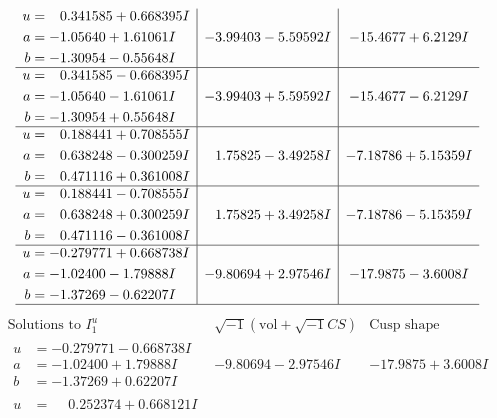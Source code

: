 \documentclass[1p]{elsarticle_modified}
\theoremstyle{definition}
\newcommand{\I}{\sqrt{-1}}
\begin{document}
$$\begin{array}{c|c|c}
\begin{aligned}
u &= \phantom{-}0.341585 + 0.668395 I \\
a &= -1.05640 + 1.61061 I \\
b &= -1.30954 - 0.55648 I\end{aligned}
 & -3.99403 - 5.59592 I & -15.4677 + 6.2129 I \\ \hline\begin{aligned}
u &= \phantom{-}0.341585 - 0.668395 I \\
a &= -1.05640 - 1.61061 I \\
b &= -1.30954 + 0.55648 I\end{aligned}
 & -3.99403 + 5.59592 I & -15.4677 - 6.2129 I \\ \hline\begin{aligned}
u &= \phantom{-}0.188441 + 0.708555 I \\
a &= \phantom{-}0.638248 - 0.300259 I \\
b &= \phantom{-}0.471116 + 0.361008 I\end{aligned}
 & \phantom{-}1.75825 - 3.49258 I & -7.18786 + 5.15359 I \\ \hline\begin{aligned}
u &= \phantom{-}0.188441 - 0.708555 I \\
a &= \phantom{-}0.638248 + 0.300259 I \\
b &= \phantom{-}0.471116 - 0.361008 I\end{aligned}
 & \phantom{-}1.75825 + 3.49258 I & -7.18786 - 5.15359 I \\ \hline\begin{aligned}
u &= -0.279771 + 0.668738 I \\
a &= -1.02400 - 1.79888 I \\
b &= -1.37269 - 0.62207 I\end{aligned}
 & -9.80694 + 2.97546 I & -17.9875 - 3.6008 I\\
 \hline 
 \end{array}$$\newpage$$\begin{array}{c|c|c}  
\text{Solutions to }I^u_{1}& \I (\text{vol} + \sqrt{-1}CS) & \text{Cusp shape}\\
 \hline 
\begin{aligned}
u &= -0.279771 - 0.668738 I \\
a &= -1.02400 + 1.79888 I \\
b &= -1.37269 + 0.62207 I\end{aligned}
 & -9.80694 - 2.97546 I & -17.9875 + 3.6008 I \\ \hline\begin{aligned}
u &= \phantom{-}0.252374 + 0.668121 I \\

\end{aligned}
\end{array}$$
\end{document}
